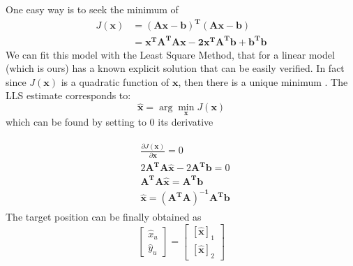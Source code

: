 \documentclass[12pt]{report}
\begin{document}
One easy way is to seek the minimum of 
\begin{align}
    J(\mathbf{x})&=\mathbf{(Ax-b)^T(Ax - b)}\\
    &=\mathbf{x^TA^TAx-2x^TA^Tb+b^Tb}
\end{align}
We can fit this model with the Least Square Method, that for a linear model (which is ours) has a known explicit solution \cite{10.5555/1557273} that can be easily verified. In fact since $J(\mathbf{x})$ is a quadratic function of $\mathbf{x}$, then there is a unique minimum \cite{Ortega1987,rzk}. The LLS estimate corresponds to:
\begin{equation}
    \hat{\mathbf{x}}=\arg \min_\mathbf{x} J(\mathbf{x})
\end{equation}
which can be found by setting to $0$ its derivative
    
\begin{align}
\begin{split}
&\frac{\partial J(\mathbf{x})}{\partial \mathbf{x}}=0\\
    &2\mathbf{A^TA}\hat{\mathbf{x}}-2\mathbf{A^Tb}=0\\
    &\mathbf{A^TA\hat{x}}=\mathbf{A^Tb}\\
    &\hat{\mathbf{x}}=\mathbf{(A^TA)^{-1}A^Tb}
\end{split}
\end{align}
The target position can be finally obtained as 
\begin{equation}
\begin{bmatrix}
    \hat{x}_u\\
    \hat{y}_u
\end{bmatrix}=
\begin{bmatrix}
    [\hat{\mathbf{x}}]_1\\
    [\hat{\mathbf{x}}]_2
\end{bmatrix}
\end{equation}
\clearpage
\end{document}

